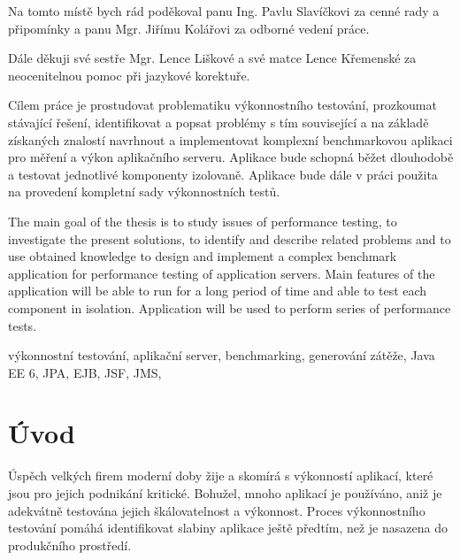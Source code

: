 \documentclass[122pt,oneside]{fithesis}
\begin{document}
\FrontMatter
\ThesisTitlePage

\begin{ThesisDeclaration}
\DeclarationText
\AdvisorName
\end{ThesisDeclaration}

\begin{ThesisThanks}
Na tomto místě bych rád poděkoval panu Ing. Pavlu Slavíčkovi za cenné rady a připomínky a panu Mgr. Jiřímu Kolářovi za odborné vedení práce.

Dále děkuji své sestře Mgr. Lence Liškové a své matce Lence Křemenské za neocenitelnou pomoc při jazykové korektuře. 
\end{ThesisThanks}

\begin{ThesisAbstract}
Cílem práce je prostudovat problematiku výkonnostního testování, prozkoumat stávající řešení, identifikovat a popsat problémy s tím související  a na základě získaných znalostí navrhnout a implementovat komplexní benchmarkovou aplikaci pro měření a výkon aplikačního serveru. Aplikace bude schopná běžet dlouhodobě a testovat jednotlivé komponenty izolovaně. Aplikace bude dále v práci použita na provedení kompletní sady výkonnostních testů.
\end{ThesisAbstract}

\begin{ThesisAbstracten}
The main goal of the thesis is to study issues of performance testing, to investigate the present solutions, to identify and describe related problems and to use obtained knowledge to design and implement a complex benchmark application for performance testing of application servers. Main features of the application will be able to run for a long period of time and able to test each component in isolation. Application will be used to perform series of performance tests.
\end{ThesisAbstracten}

\begin{ThesisKeyWords}
výkonnostní testování, aplikační server, benchmarking, generování zátěže, Java EE 6, JPA, EJB, JSF, JMS, 
\end{ThesisKeyWords}

\MainMatter
\tableofcontents

\chapter*{Úvod}
Úspěch velkých firem moderní doby žije a skomírá s výkonností aplikací, které jsou pro jejich podnikání kritické. Bohužel, mnoho aplikací je používáno, aniž je adekvátně testována jejich škálovatelnost a výkonnost. Proces výkonnostního testování pomáhá identifikovat slabiny aplikace ještě předtím, než je nasazena do produkčního prostředí.
\end{document}
